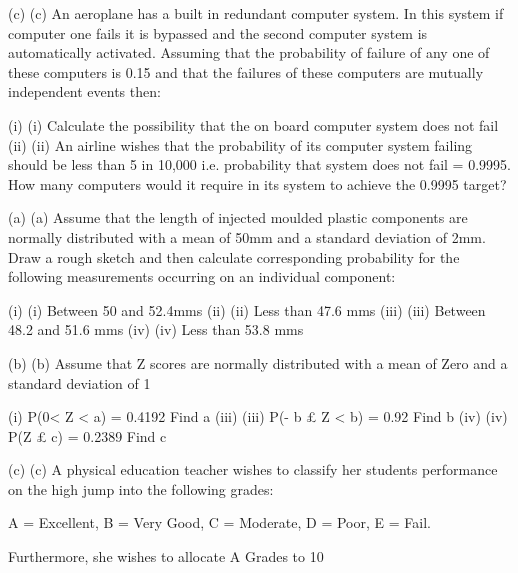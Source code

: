 (c)	(c)    An aeroplane has a built in redundant computer system.  In this system if computer one fails it is bypassed and the second computer system is automatically activated.  Assuming that the probability of failure of any one of these computers is 0.15 and that the failures of these computers are mutually independent events then:
 
(i)	(i)                  Calculate the possibility that the on board computer system does not fail
(ii)	(ii)                An airline wishes that the probability of its computer system failing should be less than 5 in 10,000 i.e. probability that system does not fail = 0.9995.  How many computers would it require in its system to achieve the 0.9995 target?
 
 
 

(a)	(a)    Assume that the length of injected moulded plastic components are normally distributed with a mean of 50mm and a standard deviation of 2mm.  Draw a rough sketch and then calculate corresponding probability for the following measurements occurring on an individual component:
 
(i)	(i)                  Between 50 and 52.4mms
(ii)	(ii)                Less than 47.6 mms
(iii)	(iii)               Between 48.2 and 51.6 mms
(iv)	(iv)              Less than 53.8 mms

 
(b)	(b)   Assume that Z scores are normally distributed with a mean of Zero and a standard deviation of 1
 
(i) 	      P(0< Z < a) = 0.4192	Find a
(iii)	(iii)               P(- b £ Z < b) = 0.92	Find b
(iv)	(iv)              P(Z £ c) = 0.2389 		Find c
 
(c)	(c)    A physical education teacher wishes to classify her students performance on the high jump into the following grades:
 
A = Excellent, B = Very Good, C = Moderate, D = Poor, E = Fail.
 
Furthermore, she wishes to allocate  A Grades to 10%
 
